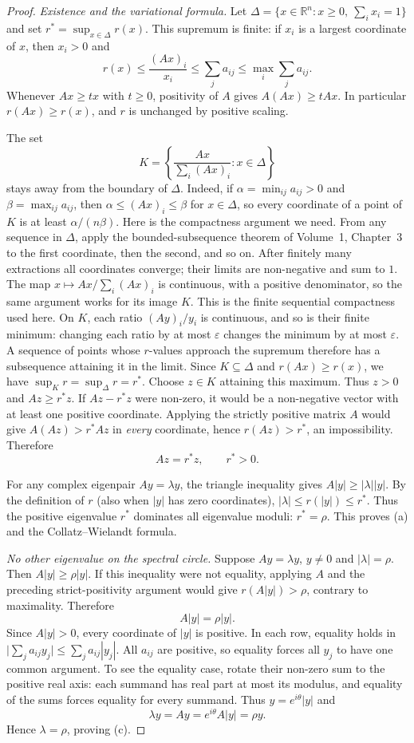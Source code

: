 \begin{proof}
\emph{Existence and the variational formula.}
Let
$\Delta=\{x\in\mathbb R^n:x\ge0,\ \sum_i x_i=1\}$
and set $r^*=\sup_{x\in\Delta}r(x)$.
This supremum is finite: if $x_i$ is
a largest coordinate of $x$, then
$x_i>0$ and
\[
r(x)\le\frac{(Ax)_i}{x_i}
\le\sum_j a_{ij}
\le\max_i\sum_j a_{ij}.
\]
Whenever $Ax\ge t x$ with $t\ge0$,
positivity of $A$ gives $A(Ax)\ge tAx$.
In particular $r(Ax)\ge r(x)$,
and $r$ is unchanged by positive scaling.

The set
\[
K=\left\{\frac{Ax}{\sum_i(Ax)_i}:x\in\Delta\right\}
\]
stays away from the boundary of $\Delta$. Indeed, if $\alpha=\min_{ij}a_{ij}>0$
and $\beta=\max_{ij}a_{ij}$, then $\alpha\le(Ax)_i\le\beta$ for $x\in\Delta$,
so every coordinate of a point of $K$ is at least $\alpha/(n\beta)$.
Here is the compactness argument we need. From any sequence in $\Delta$,
apply the bounded-subsequence theorem of Volume~1, Chapter~3 to the first
coordinate, then the second, and so on. After finitely many extractions all
coordinates converge; their limits are non-negative and sum to $1$.
The map $x\mapsto Ax/\sum_i(Ax)_i$ is continuous, with a positive denominator,
so the same argument works for its image $K$. This is the finite
sequential compactness used here. On $K$, each ratio $(Ay)_i/y_i$ is continuous,
and so is their finite minimum: changing each ratio by at most $\varepsilon$
changes the minimum by at most $\varepsilon$. A sequence of points whose
$r$-values approach the supremum therefore has a subsequence attaining it
in the limit. Since $K\subseteq\Delta$
and $r(Ax)\ge r(x)$, we have
$\sup_K r=\sup_\Delta r=r^*$.
Choose $z\in K$ attaining this maximum.
Thus $z>0$ and $Az\ge r^*z$.
If $Az-r^*z$ were non-zero, it would be
a non-negative vector with at least
one positive coordinate. Applying
the strictly positive matrix $A$
would give $A(Az)>r^*Az$ in
\emph{every} coordinate, hence
$r(Az)>r^*$, an impossibility.
Therefore
\[
Az=r^*z,\qquad r^*>0.
\]

For any complex eigenpair $Ay=\lambda y$,
the triangle inequality gives
$A|y|\ge|\lambda||y|$.
By the definition of $r$ (also when
$|y|$ has zero coordinates),
$|\lambda|\le r(|y|)\le r^*$.
Thus the positive eigenvalue $r^*$
dominates all eigenvalue moduli:
$r^*=\rho$. This proves (a) and
the Collatz--Wielandt formula.

\emph{No other eigenvalue on the spectral circle.}
Suppose $Ay=\lambda y$, $y\ne0$ and
$|\lambda|=\rho$. Then
$A|y|\ge\rho|y|$. If this inequality
were not equality, applying $A$ and
the preceding strict-positivity
argument would give $r(A|y|)>\rho$,
contrary to maximality. Therefore
\[
A|y|=\rho|y|.
\]
Since $A|y|>0$, every coordinate
of $|y|$ is positive. In each row,
equality holds in
$\bigl|\sum_j a_{ij}y_j\bigr|
 \le\sum_j a_{ij}|y_j|$.
All $a_{ij}$ are positive, so equality forces all $y_j$ to have one
common argument. To see the equality case, rotate their non-zero sum to the
positive real axis: each summand has real part at most its modulus, and
equality of the sums forces equality for every summand. Thus
$y=e^{i\theta}|y|$ and
\[
\lambda y=Ay=e^{i\theta}A|y|
=\rho y.
\]
Hence $\lambda=\rho$, proving (c).


\end{proof}
